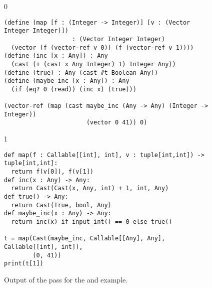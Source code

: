 \documentclass[7x10]{TimesAPriori_MIT}%
\def\racketEd{0}
\def\pythonEd{1}
\def\edition{1}
\newcommand{\pythonColor}[0]{}
\numberwithin{theorem}{chapter}
\numberwithin{definition}{chapter}
\numberwithin{equation}{chapter}
\begin{document}
\begin{figure}[btp]
  \begin{tcolorbox}[colback=white]
{\if\edition\racketEd        
\begin{lstlisting}
(define (map [f : (Integer -> Integer)] [v : (Vector Integer Integer)])
                   : (Vector Integer Integer)
  (vector (f (vector-ref v 0)) (f (vector-ref v 1))))
(define (inc [x : Any]) : Any
  (cast (+ (cast x Any Integer) 1) Integer Any))
(define (true) : Any (cast #t Boolean Any))
(define (maybe_inc [x : Any]) : Any
  (if (eq? 0 (read)) (inc x) (true)))

(vector-ref (map (cast maybe_inc (Any -> Any) (Integer -> Integer))
                       (vector 0 41)) 0)
\end{lstlisting}
\fi}
{\if\edition\pythonEd\pythonColor        
\begin{lstlisting}[basicstyle=\ttfamily\footnotesize]
def map(f : Callable[[int], int], v : tuple[int,int]) -> tuple[int,int]:
  return f(v[0]), f(v[1])
def inc(x : Any) -> Any:
  return Cast(Cast(x, Any, int) + 1, int, Any)
def true() -> Any:
  return Cast(True, bool, Any)
def maybe_inc(x : Any) -> Any:
  return inc(x) if input_int() == 0 else true()

t = map(Cast(maybe_inc, Callable[[Any], Any], Callable[[int], int]),
        (0, 41))
print(t[1])
\end{lstlisting}
\fi}
\vspace{-5pt}
\end{tcolorbox}

\caption{Output of the  pass for the 
  and  example.}
\label{fig:map-cast}
\end{figure}
\end{document}
